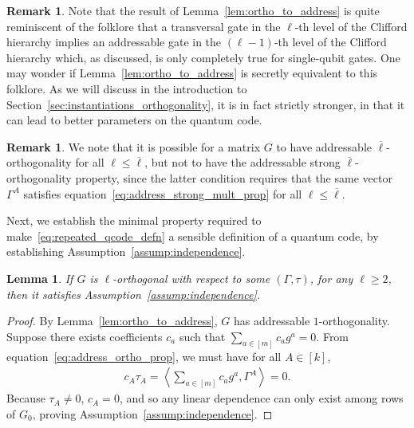 \documentclass[11pt]{article}
\newtheorem{lemma}[theorem]{Lemma}
\theoremstyle{definition}
\newtheorem{remark}[theorem]{Remark}
\renewcommand{\le}{\leqslant}
\renewcommand{\ge}{\geqslant}
\newcommand*{\ol}{\overline}
\begin{document}
\begin{remark}
    Note that the result of Lemma~\ref{lem:ortho_to_address} is quite reminiscent of the folklore that a transversal gate in the $\ell$-th level of the Clifford hierarchy implies an addressable gate in the $(\ell-1)$-th level of the Clifford hierarchy which, as discussed, is only completely true for single-qubit gates. One may wonder if Lemma~\ref{lem:ortho_to_address} is secretly equivalent to this folklore. As we will discuss in the introduction to Section~\ref{sec:instantiations_orthogonality}, it is in fact strictly stronger, in that it can lead to better parameters on the quantum code.
\end{remark}

\begin{remark}
    We note that it is possible for a matrix $G$ to have addressable $\ol\ell$-orthogonality for all $\ell\le \ol\ell$, but not to have the addressable strong $\ol\ell$-orthogonality property, since the latter condition requires that the same vector $\Gamma^A$ satisfies equation~\eqref{eq:address_strong_mult_prop} for all $\ell\le \ol\ell$. 
\end{remark}



Next, we establish the minimal property required to make~\eqref{eq:repeated_qcode_defn} a sensible definition of a quantum code, by establishing Assumption~\ref{assump:independence}.
\begin{lemma}\label{lem:ortho_to_assump}
    If $G$ is $\ell$-orthogonal with respect to some $(\Gamma,\tau)$, for any $\ell \ge 2$, then it satisfies Assumption~\ref{assump:independence}.
\end{lemma}
\begin{proof}
By Lemma~\ref{lem:ortho_to_address}, $G$ has addressable $1$-orthogonality.
Suppose there exists coefficients $c_a$ such that 
$\sum_{a\in [m]}c_ag^a = 0.$
From equation~\eqref{eq:address_ortho_prop}, we must have for all $A\in [k]$,
\begin{align}
    c_A\tau_A = \left\langle \sum_{a\in [m]}c_ag^a, \Gamma^A \right\rangle = 0.
\end{align}
Because $\tau_A \neq 0$, $c_A 
= 0$, and so any linear dependence can only exist among rows of $G_0$, proving Assumption~\ref{assump:independence}.
\end{proof}
\end{document}
